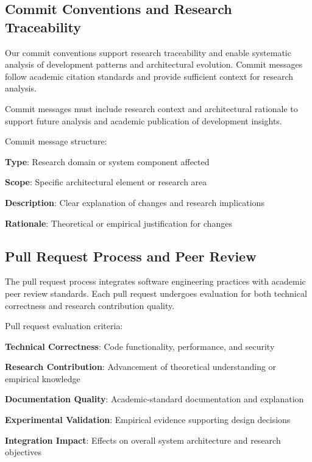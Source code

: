 \subsection*{Commit Conventions and Research Traceability}

Our commit conventions support research traceability and enable systematic analysis of development patterns and architectural evolution. Commit messages follow academic citation standards and provide sufficient context for research analysis.

\begin{alertbox}
Commit messages must include research context and architectural rationale to support future analysis and academic publication of development insights.
\end{alertbox}

Commit message structure:
\begin{compactlist}
    \item \textbf{Type}: Research domain or system component affected
    \item \textbf{Scope}: Specific architectural element or research area
    \item \textbf{Description}: Clear explanation of changes and research implications
    \item \textbf{Rationale}: Theoretical or empirical justification for changes
\end{compactlist}

\subsection*{Pull Request Process and Peer Review}

The pull request process integrates software engineering practices with academic peer review standards. Each pull request undergoes evaluation for both technical correctness and research contribution quality.

Pull request evaluation criteria:
\begin{expandedlist}
    \item \textbf{Technical Correctness}: Code functionality, performance, and security
    \item \textbf{Research Contribution}: Advancement of theoretical understanding or empirical knowledge
    \item \textbf{Documentation Quality}: Academic-standard documentation and explanation
    \item \textbf{Experimental Validation}: Empirical evidence supporting design decisions
    \item \textbf{Integration Impact}: Effects on overall system architecture and research objectives
\end{expandedlist}

